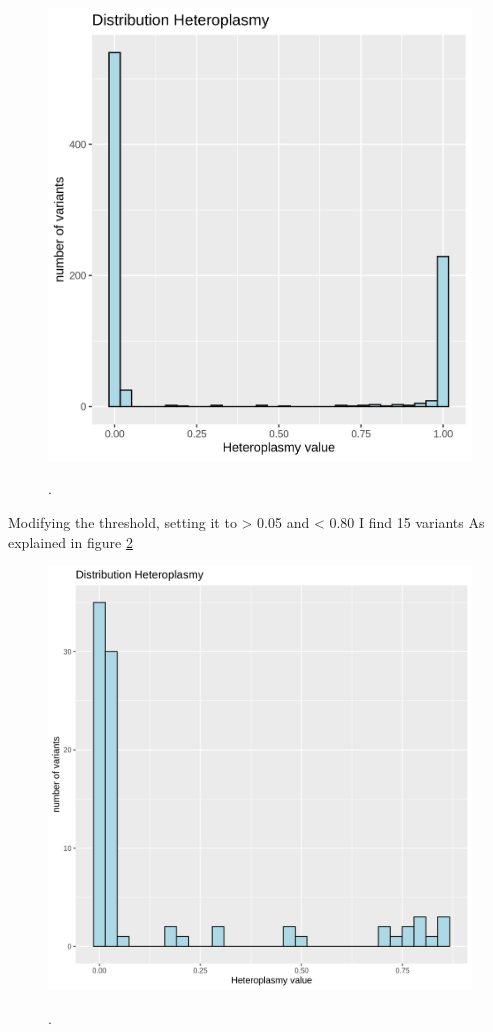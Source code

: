 \begin{figure}[H]
\centering
\includegraphics[width=\textwidth]{Fig/histogram.png}
\decoRule
\caption{\textbf{}} \textit{\cite{}}. 
\label{fig:distributionHet}
\end{figure} 

Modifying the threshold, setting it to  > 0.05 and < 0.80 I find 15 variants As explained in figure \ref{fig:distribution2} 
 \\ 

\begin{figure}[H]
\centering
\includegraphics[width=\textwidth]{Fig/dist_heteroplasmy_from-01-90.png}
\decoRule
\caption{\textbf{}} \textit{\cite{}}. 
\label{fig:distribution2}
\end{figure} 


